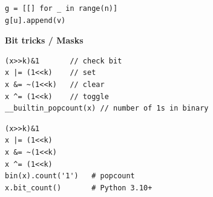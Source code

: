 \begin{verbatim}
g = [[] for _ in range(n)]
g[u].append(v)
\end{verbatim}

\textbf{Bit tricks / Masks}
\begin{verbatim}
(x>>k)&1       // check bit
x |= (1<<k)    // set
x &= ~(1<<k)   // clear
x ^= (1<<k)    // toggle
__builtin_popcount(x) // number of 1s in binary
\end{verbatim}

\begin{verbatim}
(x>>k)&1
x |= (1<<k)
x &= ~(1<<k)
x ^= (1<<k)
bin(x).count('1')   # popcount
x.bit_count()       # Python 3.10+
\end{verbatim}
